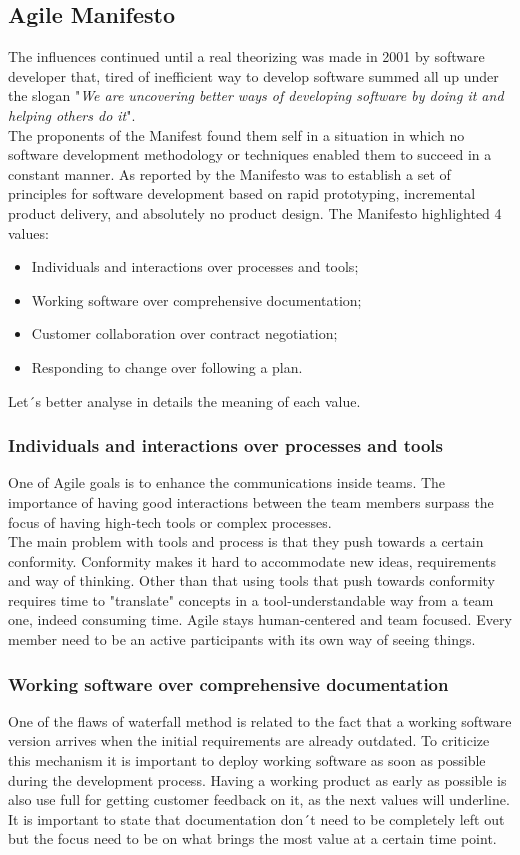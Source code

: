 \documentclass[../main.tex]{subfiles}
\begin{document}
\subsection{Agile Manifesto}
The influences continued until a real theorizing was made in 2001 by software developer that, tired of inefficient way to develop software summed all up under the slogan "\textit{We are uncovering better ways of developing software by doing it and helping others do it}". \\
The proponents of the Manifest found them self in a situation in which no software development methodology or techniques enabled them to succeed in a constant manner. As reported by \citet{schmidt2013software} the Manifesto was to establish a set of principles for software development based on rapid prototyping, incremental product delivery, and absolutely no product design. The Manifesto highlighted 4 values:
\begin{itemize}
    \item Individuals and interactions over processes and tools;
    \item Working software over comprehensive documentation;
    \item Customer collaboration over contract negotiation;
    \item Responding to change over following a plan.
\end{itemize}
Let´s better analyse in details the meaning of each value. 
\subsubsection{Individuals and interactions over processes and tools}
One of Agile goals is to enhance the communications inside teams. The importance of having good interactions between the team members surpass the focus of having high-tech tools or complex processes. \\
The main problem with tools and process is that they push towards a certain conformity. Conformity makes it hard to accommodate new ideas, requirements and way of thinking. Other than that using tools that push towards conformity requires time to "translate" concepts in a tool-understandable way from a team one, indeed consuming time. Agile stays human-centered and team focused. Every member need to be an active participants with its own way of seeing things. 
\subsubsection{Working software over comprehensive documentation}
One of the flaws of waterfall method is related to the fact that a working software version arrives when the initial requirements are already outdated. To criticize this mechanism it is important to deploy working software as soon as possible during the development process. Having a working product as early as possible is also use full for getting customer feedback on it, as the next values will underline. 
It is important to state that documentation don´t need to be completely left out but the focus need to be on what brings the most value at a certain time point.
\end{document}
